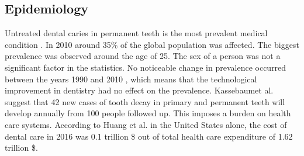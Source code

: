 \subsection{Epidemiology}
Untreated dental caries in permanent teeth is the most prevalent medical condition \cite{Kassebaum2015}. In 2010 around 35\% of the global population was affected. The biggest prevalence was observed around the age of 25. The sex of a person was not a significant factor in the statistics. No noticeable change in prevalence occurred between the years 1990 and 2010 \cite{Kassebaum2015} \cite{Frencken2017}, which means that the technological improvement in dentistry had no effect on the prevalence.
Kassebaumet al. suggest that 42 new cases of tooth decay in primary and permanent teeth will develop annually from 100 people followed up. This imposes a burden on health care systems. According to Huang et al. \cite{Hung2020} in the United States alone, the cost of dental care in 2016 was 0.1 trillion \$ out of total health care expenditure of 1.62 trillion \$.

